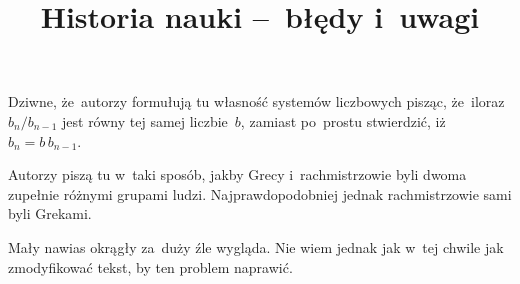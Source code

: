 \documentclass[a4paper,11pt]{article}
\title{Historia nauki --~błędy i~uwagi}
\begin{document}



\maketitle %






\start {} Dziwne, że~autorzy formułują tu własność systemów
liczbowych pisząc, że~iloraz $b_{ n } / b_{ n - 1 }$ jest równy tej
samej liczbie~$b$, zamiast po~prostu stwierdzić,
iż~$b_{ n } = b \, b_{ n - 1 }$.

\vspace{\spaceFour}


\start {} Autorzy piszą tu w~taki sposób, jakby Grecy
i~rachmistrzowie byli dwoma zupełnie różnymi grupami ludzi.
Najprawdopodobniej jednak rachmistrzowie sami byli Grekami.

\vspace{\spaceFour}


\start {} Mały nawias okrągły za~duży źle wygląda. Nie
wiem jednak jak w~tej chwile jak zmodyfikować tekst, by ten problem
naprawić.
\end{document}
